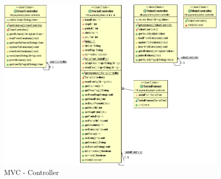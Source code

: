 \documentclass[11pt]{article} %
\begin{document}
\begin{figure}[htb] \centering
\includegraphics[width=\textwidth,keepaspectratio=true]{UML_Controller.png}
\caption{MVC - Controller}
\end{figure}
\end{document}
